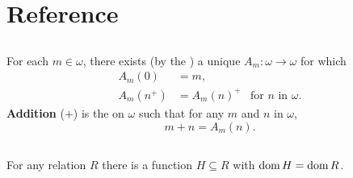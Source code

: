 \documentclass{report}
\begin{document}

\tableofcontents

\begingroup
\renewcommand\thechapter{R}
\setcounter{chapter}{0}
\addtocounter{chapter}{-1}

\chapter{Reference}%

\section{}%
\label{ref:addition}

For each $m \in \omega$, there exists (by the
  ) a unique
   $A_m \colon \omega \rightarrow \omega$ for which
  \begin{align*}
    A_m(0) & = m, \\
    A_m(n^+) & = A_m(n)^+ & \text{for } n \text{ in } \omega.
  \end{align*}
\textbf{Addition} ($+$) is the  on $\omega$ such
  that for any $m$ and $n$ in $\omega$, $$m + n = A_m(n).$$

\begin{definition}


\end{definition}

\section{}%

For any relation $R$ there is a function $H \subseteq R$ with
  $\mathop{\text{dom}}{H} = \mathop{\text{dom}}{R}$.

\begin{axiom}


\end{axiom}

\section{}%
\end{document}
